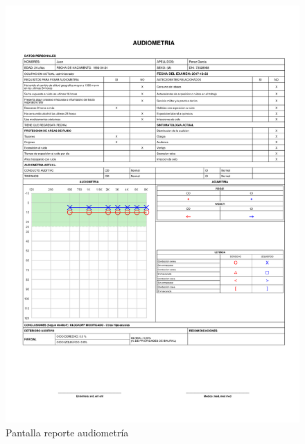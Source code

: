 	\begin{figure}[H]
	    \centering
		\includegraphics[width=18cm]{../imgs/reportes/audiometria}
		\caption{Pantalla reporte audiometría}
		\label{figure:reporte-audiometria}
	\end{figure}
	
